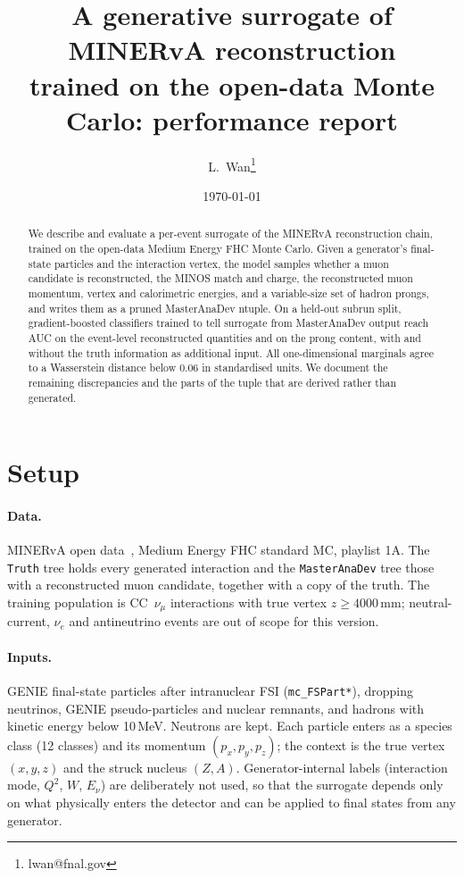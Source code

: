 \documentclass[11pt]{article}
\title{A generative surrogate of MINERvA reconstruction\\ trained on the open-data Monte Carlo: performance report}
\author{L.~Wan\thanks{lwan@fnal.gov}}
\date{\today}
\begin{document}
\maketitle

\begin{abstract}
We describe and evaluate a per-event surrogate of the MINERvA reconstruction chain, trained on the open-data
Medium Energy FHC Monte Carlo. Given a generator's final-state particles and the interaction vertex, the model
samples whether a muon candidate is reconstructed, the MINOS match and charge, the reconstructed muon momentum,
vertex and calorimetric energies, and a variable-size set of hadron prongs, and writes them as a pruned
MasterAnaDev ntuple. On a held-out subrun split, gradient-boosted classifiers trained to tell surrogate from
MasterAnaDev output reach AUC \nAUCmarg{} on the event-level reconstructed quantities and
\nAUCprong{} on the prong content, with and without the truth information as additional input. All
one-dimensional marginals agree to a Wasserstein distance below 0.06 in standardised units. We document the
remaining discrepancies and the parts of the tuple that are derived rather than generated.
\end{abstract}

\tableofcontents
\listoffigures
\listoftables
\clearpage

\section{Setup}
\label{sec:setup}

\paragraph{Data.} MINERvA open data~\cite{opendata}, Medium Energy FHC standard MC, playlist 1A. The
\texttt{Truth} tree holds every generated interaction and the \texttt{MasterAnaDev} tree those with a
reconstructed muon candidate, together with a copy of the truth. The training population is CC~$\nu_\mu$
interactions with true vertex $z \ge 4000$\,mm; neutral-current, $\nu_e$ and antineutrino events are out of
scope for this version. 

\paragraph{Inputs.} GENIE final-state particles after intranuclear FSI (\texttt{mc\_FSPart*}), dropping
neutrinos, GENIE pseudo-particles and nuclear remnants, and hadrons with kinetic energy below 10\,MeV. Neutrons
are kept. Each particle enters as a species class (12 classes) and its momentum $(p_x, p_y, p_z)$; the context is
the true vertex $(x,y,z)$ and the struck nucleus $(Z, A)$. Generator-internal labels (interaction mode, $Q^2$,
$W$, $E_\nu$) are deliberately not used, so that the surrogate depends only on what physically enters the
detector and can be applied to final states from any generator.
\end{document}
